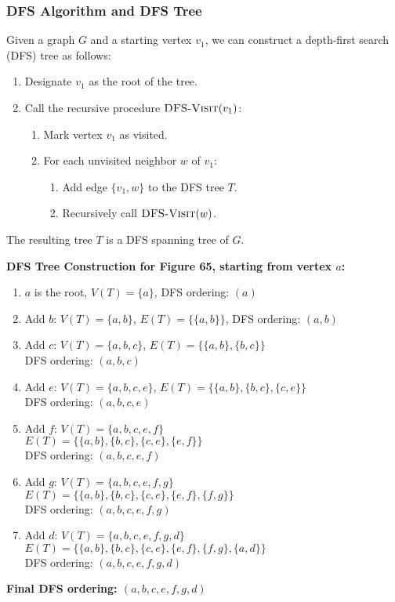 \documentclass{article}
\theoremstyle{definition}
\begin{document}
\subsubsection{DFS Algorithm and DFS Tree}
Given a graph $G$ and a starting vertex $v_1$, we can construct a depth-first search (DFS) tree as follows:
\begin{enumerate}
\item Designate $v_1$ as the root of the tree.
\item Call the recursive procedure $\textsc{DFS-Visit}(v_1)$:
   \begin{enumerate}
   \item Mark vertex $v_1$ as visited.
   \item For each unvisited neighbor $w$ of $v_1$:
      \begin{enumerate}
      \item Add edge $\{v_1,w\}$ to the DFS tree $T$.
      \item Recursively call $\textsc{DFS-Visit}(w)$.
      \end{enumerate}
   \end{enumerate}
\end{enumerate}
The resulting tree $T$ is a DFS spanning tree of $G$.

\noindent\textbf{DFS Tree Construction for Figure 65, starting from vertex $a$:}
\begin{enumerate}
\item $a$ is the root, $V(T) = \{a\}$, DFS ordering: $(a)$
\item Add $b$: $V(T) = \{a, b\}$, $E(T) = \{\{a, b\}\}$, DFS ordering: $(a, b)$
\item Add $c$: $V(T) = \{a, b, c\}$, $E(T) = \{\{a, b\}, \{b, c\}\}$\\
   DFS ordering: $(a, b, c)$
\item Add $e$: $V(T) = \{a, b, c, e\}$, $E(T) = \{\{a, b\}, \{b, c\}, \{c, e\}\}$\\
   DFS ordering: $(a, b, c, e)$
\item Add $f$: $V(T) = \{a, b, c, e, f\}$\\
   $E(T) = \{\{a, b\}, \{b, c\}, \{c, e\}, \{e, f\}\}$\\
   DFS ordering: $(a, b, c, e, f)$
\item Add $g$: $V(T) = \{a, b, c, e, f, g\}$\\
   $E(T) = \{\{a, b\}, \{b, c\}, \{c, e\}, \{e, f\}, \{f, g\}\}$\\
   DFS ordering: $(a, b, c, e, f, g)$
\item Add $d$: $V(T) = \{a, b, c, e, f, g, d\}$\\
   $E(T) = \{\{a, b\}, \{b, c\}, \{c, e\}, \{e, f\}, \{f, g\}, \{a, d\}\}$\\
   DFS ordering: $(a, b, c, e, f, g, d)$
\end{enumerate}
\textbf {Final DFS ordering: $(a, b, c, e, f, g, d)$}
\end{document}
